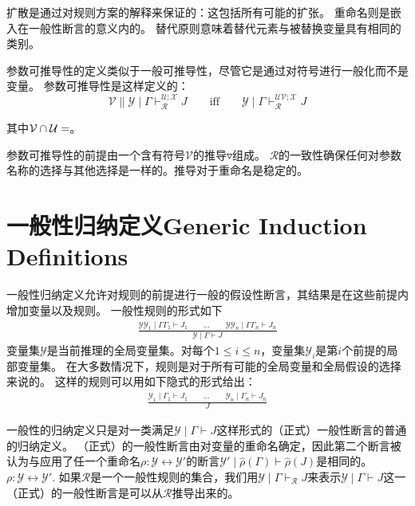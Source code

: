 扩散是通过对规则方案的解释来保证的：这包括所有可能的扩张。
重命名则是嵌入在一般性断言的意义内的。
替代原则意味着替代元素与被替换变量具有相同的类别。

参数可推导性的定义类似于一般可推导性，尽管它是通过对符号进行一般化而不是变量。
参数可推导性是这样定义的：
$$ \mathcal{V} \parallel \mathcal{Y} \mid \Gamma \vdash_{\mathcal{R}}^{\mathcal{U};\mathcal{X}} J \qquad \text{iff} \qquad \mathcal{Y} \mid \Gamma \vdash_{\mathcal{R}}^{\mathcal{UV};\mathcal{X}} J$$

其中$\mathcal{V} \cap \mathcal{U} = \empty$。

参数可推导性的前提由一个含有符号$\mathcal{V}$的推导$\triangledown$组成。
$ \mathcal{R} $的一致性确保任何对参数名称的选择与其他选择是一样的。推导对于重命名是稳定的。

\section{一般性归纳定义Generic Induction Definitions}
一般性归纳定义允许对规则的前提进行一般的假设性断言，其结果是在这些前提内增加变量以及规则。
一般性规则的形式如下
\begin{equation}
    \begin{aligned}
        \frac{\mathcal{YY}_1 \mid \Gamma \Gamma_1 \vdash J_1 \qquad \dots \qquad \mathcal{YY}_n \mid \Gamma \Gamma_n \vdash J_n}{\mathcal{Y} \mid \Gamma \vdash J} \label{equation:three_twelve}
    \end{aligned}
\end{equation}
变量集$\mathcal{Y}$是当前推理的全局变量集。对每个$1 \le i \le n$，变量集$\mathcal{Y}_i$是第$i$个前提的局部变量集。
在大多数情况下，规则是对于所有可能的全局变量和全局假设的选择来说的。
这样的规则可以用如下隐式的形式给出：
\begin{equation}
    \begin{aligned}
        \frac{\mathcal{Y}_1 \mid \Gamma_1 \vdash J_1 \qquad \dots \qquad \mathcal{Y}_n \mid \Gamma_n \vdash J_n}{J}
    \end{aligned}
\end{equation}

一般性的归纳定义只是对一类满足$ \mathcal{Y} \mid \Gamma \vdash J$这样形式的（正式）一般性断言的普通的归纳定义。
（正式）的一般性断言由对变量的重命名确定，因此第二个断言被认为与应用了任一个重命名$\rho : \mathcal{Y} \leftrightarrow \mathcal{Y}'$的断言$\mathcal{Y}' \mid \widehat{\rho}(\Gamma) \vdash \widehat{\rho}(J) $是相同的。
$\rho : \mathcal{Y} \leftrightarrow \mathcal{Y}'$.
如果$\mathcal{R}$是一个一般性规则的集合，我们用$\mathcal{Y} \mid \Gamma \vdash_{\mathcal{R}} J$来表示$\mathcal{Y} \mid \Gamma \vdash J$这一（正式）的一般性断言是可以从$\mathcal{R}$推导出来的。

